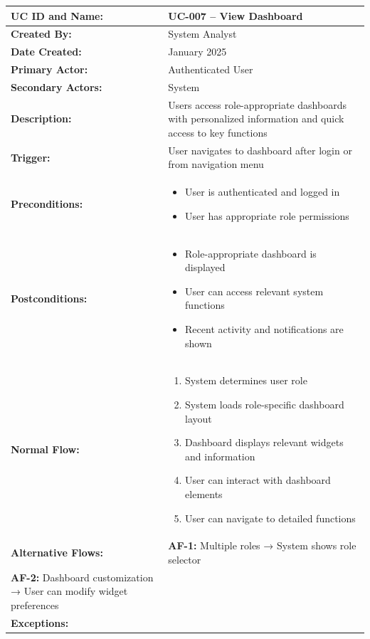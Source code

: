\documentclass[12pt,a4paper]{article}
\begin{document}
\renewcommand{\arraystretch}{1.5}
\begin{longtable}{|p{4.5cm}|p{10.5cm}|}
\hline
\textbf{UC ID and Name:} & UC-007 – View Dashboard \\
\hline
\textbf{Created By:} & System Analyst \\
\hline
\textbf{Date Created:} & January 2025 \\
\hline
\textbf{Primary Actor:} & Authenticated User \\
\hline
\textbf{Secondary Actors:} & System \\
\hline
\textbf{Description:} & Users access role-appropriate dashboards with personalized information and quick access to key functions \\
\hline
\textbf{Trigger:} & User navigates to dashboard after login or from navigation menu \\
\hline
\textbf{Preconditions:} &
\begin{itemize}
  \item User is authenticated and logged in
  \item User has appropriate role permissions
\end{itemize} \\
\hline
\textbf{Postconditions:} &
\begin{itemize}
  \item Role-appropriate dashboard is displayed
  \item User can access relevant system functions
  \item Recent activity and notifications are shown
\end{itemize} \\
\hline
\textbf{Normal Flow:} &
\begin{enumerate}
  \item System determines user role
  \item System loads role-specific dashboard layout
  \item Dashboard displays relevant widgets and information
  \item User can interact with dashboard elements
  \item User can navigate to detailed functions
\end{enumerate} \\
\hline
\textbf{Alternative Flows:} &
\textbf{AF-1:} Multiple roles → System shows role selector \\
\textbf{AF-2:} Dashboard customization → User can modify widget preferences \\
\hline
\textbf{Exceptions:} &

\end{longtable}
\end{document}
